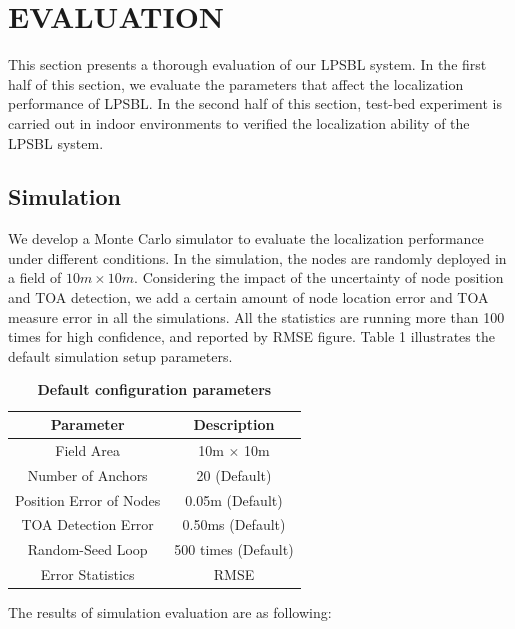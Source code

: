 \section{EVALUATION }
\label{section:results}
This section presents a thorough evaluation of our LPSBL system.
In the first half of this section, we evaluate the parameters that affect the localization performance of LPSBL.
In the second half of this section, test-bed experiment is carried out in indoor environments to verified the localization ability of the LPSBL system.

\subsection{Simulation}
We develop a Monte Carlo simulator to evaluate the localization performance under different conditions.
In the simulation, the nodes are randomly deployed in a field of $10m \times 10m$. 
Considering the impact of the uncertainty of node position and TOA detection, we add a certain amount of node location error and TOA measure error in all the simulations.
All the statistics are running more than 100 times for high confidence, and reported by RMSE figure. 
Table 1 illustrates the default simulation setup parameters.
\begin{table} [!h] \normalsize
\caption {\textbf{Default configuration parameters}} %
\centering %
    \begin{tabular}{|c|c|}
        \hline
Parameter & Description \\
 \hline
Field Area & 10m $\times$ 10m \\
\hline
Number of Anchors & 20 (Default) \\
 \hline
Position Error of Nodes	 & 0.05m (Default) \\
 \hline
TOA Detection Error 	 & 0.50ms (Default) \\
 \hline
Random-Seed Loop	 & 500 times (Default) \\
 \hline
Error Statistics	 &  RMSE \\
        \hline
    \end{tabular}
\end{table}

The results of simulation evaluation are as following:


